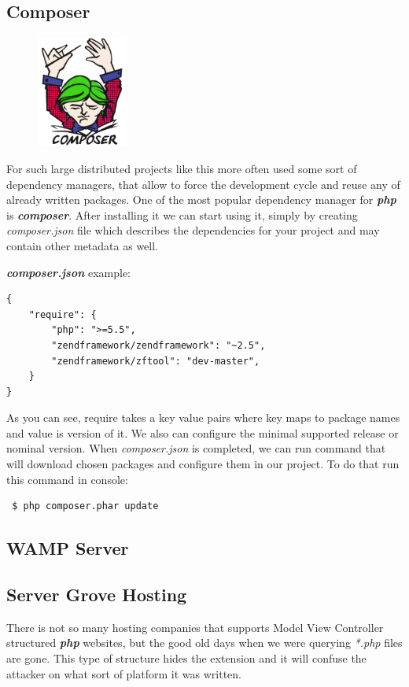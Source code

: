     \subsection{Composer}
\begin{figure}
	\includegraphics[width=3cm]{img/zf2/composer-logo.png}
\end{figure} 
For such large distributed projects like this more often used some sort of dependency managers, that allow to force the development cycle and reuse any of already written packages. One of the most popular dependency manager for \textbf{\textit{php}} is \textbf{\textit{composer}}.
After installing it we can start using it, simply by creating \textit{composer.json} file which describes the dependencies for your project and may contain other metadata as well.~\cite{Composer_doc} 

\textbf{\textit{composer.json}} example:

\begin{verbatim}
{
    "require": {
        "php": ">=5.5",
        "zendframework/zendframework": "~2.5",
        "zendframework/zftool": "dev-master",
    }
}
\end{verbatim}

As you can see, require takes a key value pairs where key maps to package names and value is version of it. We also can configure the minimal supported release or nominal version. When \textit{composer.json} is completed, we can run command that will download chosen packages and configure them in our project. To do that run this command in console:
\begin{verbatim}
 $ php composer.phar update
\end{verbatim} 

    \subsection{WAMP Server}

    \subsection{Server Grove Hosting}
There is not so many hosting companies that supports Model View Controller structured \textbf{\textit{php}} websites, but the good old days when we were querying \textit{*.php} files are gone. This type of structure hides the extension and it will confuse the attacker on what sort of platform it was written.


